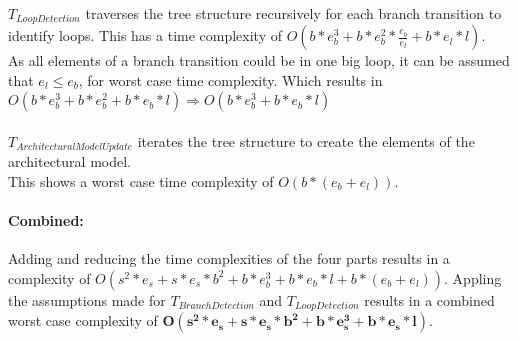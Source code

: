 \documentclass[10pt,a4paper]{article}
\begin{document}
	\\
	$T_{LoopDetection}$ traverses the tree structure recursively for each branch transition to identify loops. This has a time complexity of $O(b*e_b^{3} + b*e_b^{2}*\frac{e_b}{e_l} + b*e_l*l)$.\\
	As all elements of a branch transition could be in one big loop, it can be assumed that $e_l \leq e_b$, for worst case time complexity. Which results in $O(b*e_b^{3} + b*e_b^{2} + b*e_b*l) \Rightarrow O(b*e_b^{3} + b*e_b*l)$\\
	\\
	$T_{ArchitecturalModelUpdate}$ iterates the tree structure to create the elements of the architectural model.\\
	This shows a worst case time complexity of $O(b*(e_b + e_l))$.
	
	\paragraph{Combined:}
	Adding and reducing the time complexities of the four parts results in a complexity of $O(s^2*e_s + s*e_s*b^2 + b*e_b^{3} + b*e_b*l + b*(e_b + e_l))$. Appling the assumptions made for $T_{BranchDetection}$ and $T_{LoopDetection}$ results in a combined worst case complexity of $\mathbf{O(s^2*e_s + s*e_s*b^2 + b*e_s^{3} + b*e_s*l)}$.
	
\end{document}
